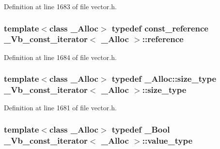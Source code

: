 Definition at line 1683 of file vector.\+h.

\hypertarget{class___vb__const__iterator_a15c6fa96bc01a672faec26fbaa7279f4}{
\subsubsection[{reference}]{\setlength{\rightskip}{0pt plus 5cm}template$<$class \+\_\+\+Alloc$>$ typedef {\bf const\+\_\+reference} {\bf \+\_\+\+Vb\+\_\+const\+\_\+iterator}$<$ \+\_\+\+Alloc $>$\+::{\bf reference}}}\label{class___vb__const__iterator_a15c6fa96bc01a672faec26fbaa7279f4}


Definition at line 1684 of file vector.\+h.

\hypertarget{class___vb__const__iterator_ab4d2e8e7d079361dd5e50ac335420b09}{
\subsubsection[{size\+\_\+type}]{\setlength{\rightskip}{0pt plus 5cm}template$<$class \+\_\+\+Alloc$>$ typedef \+\_\+\+Alloc\+::size\+\_\+type {\bf \+\_\+\+Vb\+\_\+const\+\_\+iterator}$<$ \+\_\+\+Alloc $>$\+::{\bf size\+\_\+type}}}\label{class___vb__const__iterator_ab4d2e8e7d079361dd5e50ac335420b09}


Definition at line 1681 of file vector.\+h.

\hypertarget{class___vb__const__iterator_a8b63263ffd9490c057e4c63ae5e4a586}{
\subsubsection[{value\+\_\+type}]{\setlength{\rightskip}{0pt plus 5cm}template$<$class \+\_\+\+Alloc$>$ typedef \+\_\+\+Bool {\bf \+\_\+\+Vb\+\_\+const\+\_\+iterator}$<$ \+\_\+\+Alloc $>$\+::{\bf value\+\_\+type}}}\label{class___vb__const__iterator_a8b63263ffd9490c057e4c63ae5e4a586}


